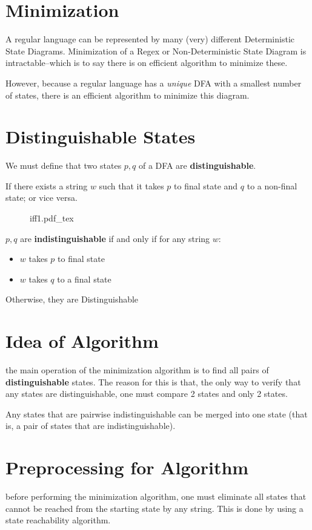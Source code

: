 \documentclass[12pt]{book}
\title{\coursetitle\linebreak\lecturename}
\author{\\Cain Susko\\ 
           \\ \\ \\
      Queen's University 
    \\School of Computing\\}
\newcommand{\incfig}[1]{%
    {#1.pdf_tex}
}
\begin{document}
\begin{titlepage}
        \maketitle
\end{titlepage}


\section*{Minimization}
A regular language can be represented by many (very) different Deterministic State Diagrams.
Minimization of a Regex or Non-Deterministic State Diagram is intractable--which is to say there 
        is on efficient algorithm to minimize these.

However, because a regular language has a \textit{unique} DFA with a smallest number of states,
        there is an efficient algorithm to minimize this diagram.

\section*{Distinguishable States}
We must define that two states $p,q$ of a DFA are \textbf{distinguishable}.

If there exists a string  $w$ such that it takes  $p$ to final state and  $q$ to a non-final state; or vice versa.

 \begin{figure}[h]
        \centering
        \incfig{iff1}
\end{figure}

$p,q$ are \textbf{indistinguishable} if and only if for any string $w$:
 \begin{itemize}
        \item $w$ takes  $p$ to final state
        \item  $w$ takes  $q$ to a final state
\end{itemize}

Otherwise, they are Distinguishable 
\pagebreak


\section*{Idea of Algorithm}
the main operation of the minimization algorithm is to find all pairs of \textbf{distinguishable} states.
The reason for this is that, the only way to verify that any states are distinguishable, one must
        compare 2 states and only 2 states.

Any states that are pairwise indistinguishable can be merged into one state (that is, a pair of states that are indistinguishable).

\section*{Preprocessing for Algorithm}
before performing the minimization algorithm, one must eliminate all states that cannot be reached from the starting state
        by any string.
This is done by using a state reachability algorithm.
\end{document}
